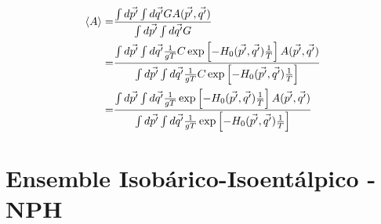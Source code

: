 \documentclass[twoside, a4paper]{scrartcl}
\begin{document}
\begin{align}
	\left<A\right> =& \frac{ \int d\vec{p'} \int d\vec{q'} G A(\vec{p'}, \vec{q'})} {\int d\vec{p'} \int d\vec{q'}G} \notag \\
	=& \frac{ \int d\vec{p'} \int d\vec{q'} \frac{1}{gT} C \exp\left[-H_0(\vec{p'}, \vec{q'}) \frac{1}{T}\right] A(\vec{p'}, \vec{q'})}
	{ \int d\vec{p'} \int d\vec{q'} \frac{1}{gT} C \exp\left[-H_0(\vec{p'}, \vec{q'}) \frac{1}{T}\right]} \notag \\
	=& \frac{ \int d\vec{p'} \int d\vec{q'} \frac{1}{gT} \exp\left[-H_0(\vec{p'}, \vec{q'}) \frac{1}{T}\right] A(\vec{p'}, \vec{q'})}
	{ \int d\vec{p'} \int d\vec{q'} \frac{1}{gT} \exp\left[-H_0(\vec{p'}, \vec{q'}) \frac{1}{T}\right]} 
\end{align}

\section{Ensemble Isobárico-Isoentálpico - NPH}
\end{document}
